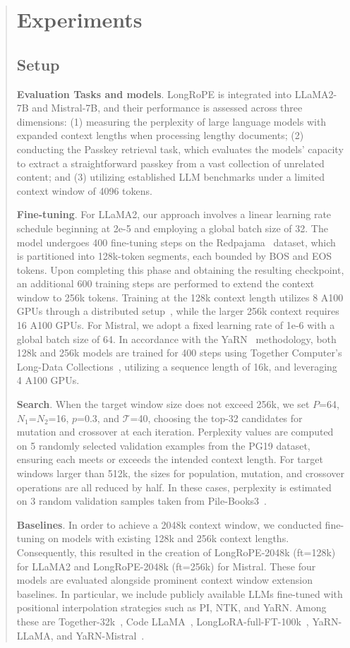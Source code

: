 \begin{abstract}
 \section{Experiments}

\subsection{Setup}
\textbf{Evaluation Tasks and models}. LongRoPE is integrated into LLaMA2-7B and Mistral-7B, and their performance is assessed across three dimensions: (1) measuring the perplexity of large language models with expanded context lengths when processing lengthy documents; (2) conducting the Passkey retrieval task, which evaluates the models' capacity to extract a straightforward passkey from a vast collection of unrelated content; and (3) utilizing established LLM benchmarks under a limited context window of 4096 tokens.

\textbf{Fine-tuning}. For LLaMA2, our approach involves a linear learning rate schedule beginning at 2e-5 and employing a global batch size of 32. The model undergoes 400 fine-tuning steps on the Redpajama~\cite{redpajama} dataset, which is partitioned into 128k-token segments, each bounded by BOS and EOS tokens. Upon completing this phase and obtaining the resulting checkpoint, an additional 600 training steps are performed to extend the context window to 256k tokens. Training at the 128k context length utilizes 8 A100 GPUs through a distributed setup~\cite{cube}, while the larger 256k context requires 16 A100 GPUs. For Mistral, we adopt a fixed learning rate of 1e-6 with a global batch size of 64. In accordance with the YaRN~\cite{yarn} methodology, both 128k and 256k models are trained for 400 steps using Together Computer's Long-Data Collections~\cite{mistraldata}, utilizing a sequence length of 16k, and leveraging 4 A100 GPUs.

\textbf{Search}. When the target window size does not exceed 256k, we set $P$=64, $N_1$=$N_2$=16, $p$=0.3, and $\mathcal{T}$=40, choosing the top-32 candidates for mutation and crossover at each iteration. Perplexity values are computed on 5 randomly selected validation examples from the PG19 dataset, ensuring each meets or exceeds the intended context length. For target windows larger than 512k, the sizes for population, mutation, and crossover operations are all reduced by half. In these cases, perplexity is estimated on 3 random validation samples taken from Pile-Books3~\cite{pile}.

\textbf{Baselines}. In order to achieve a 2048k context window, we conducted fine-tuning on models with existing 128k and 256k context lengths. Consequently, this resulted in the creation of LongRoPE-2048k (ft=128k) for LLaMA2 and LongRoPE-2048k (ft=256k) for Mistral. These four models are evaluated alongside prominent context window extension baselines. In particular, we include publicly available LLMs fine-tuned with positional interpolation strategies such as PI, NTK, and YaRN. Among these are Together-32k~\cite{together}, Code LLaMA~\cite{codellama}, LongLoRA-full-FT-100k~\cite{longlora}, YaRN-LLaMA, and YaRN-Mistral~\cite{yarn}.


\end{abstract}
